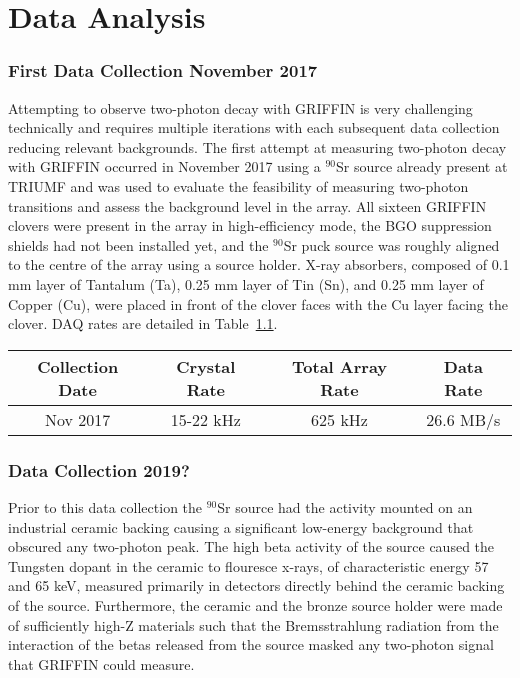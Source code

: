 \documentclass[cnatzke_thesis_proposal.tex]{subfiles}
\begin{document}
\chapter{Data Analysis}

\subsection{First Data Collection November 2017}
Attempting to observe two-photon decay with GRIFFIN is very challenging technically and requires multiple iterations with each subsequent data collection reducing relevant backgrounds. 
The first attempt at measuring two-photon decay with GRIFFIN occurred in November 2017 using a $^{90}$Sr source already present at TRIUMF and was used to evaluate the feasibility of measuring two-photon transitions and assess the background level in the array. 
All sixteen GRIFFIN clovers were present in the array in high-efficiency mode, the BGO suppression shields had not been installed yet, and the $^{90}$Sr puck source was roughly aligned to the centre of the array using a source holder. 
X-ray absorbers, composed of 0.1 mm layer of Tantalum (Ta), 0.25 mm layer of Tin (Sn), and 0.25 mm layer of Copper (Cu), were placed in front of the clover faces with the Cu layer facing the clover. 
DAQ rates are detailed in Table~\ref{tab:daq_rates}.
\begin{table}[]
  \begin{tabular}{c|ccc}
  \textbf{Collection Date} & \textbf{Crystal Rate} & \textbf{Total Array Rate} & \textbf{Data Rate} \\ \hline
  Nov 2017                 & 15-22 kHz             & 625 kHz                   & 26.6 MB/s         
  \end{tabular}
  \label{tab:daq_rates}
\end{table}


\subsection{Data Collection 2019?}

Prior to this data collection the $^{90}$Sr source had the activity mounted on an industrial ceramic backing causing a significant low-energy background that obscured any two-photon peak. 
The high beta activity of the source caused the Tungsten dopant in the ceramic to flouresce x-rays, of characteristic energy 57 and 65 keV, measured primarily in detectors directly behind the ceramic backing of the source. 
Furthermore, the ceramic and the bronze source holder were made of sufficiently high-Z materials such that the Bremsstrahlung radiation from the interaction of the betas released from the source masked any two-photon signal that GRIFFIN could measure. 
\end{document}
